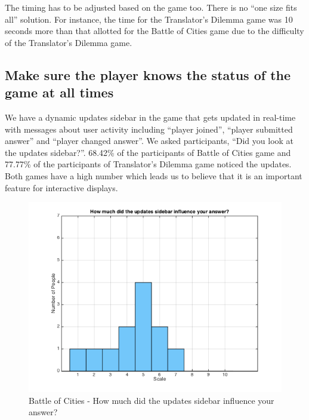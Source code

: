 \documentclass{sig-alternate}
\begin{document}
The timing has to be adjusted based on the game too. There is no ``one size fits all'' solution. For instance, the time for the Translator's Dilemma game was 10 seconds more than that allotted for the Battle of Cities game due to the difficulty of the Translator's Dilemma game.

\subsection{Make sure the player knows the status of the game at all times}
We have a dynamic updates sidebar in the game that gets updated in real-time with messages about user activity including ``player joined'', ``player submitted answer'' and ``player changed answer''. We asked participants, ``Did you look at the updates sidebar?''. 68.42\% of the participants of Battle of Cities game and 77.77\% of the participants of Translator's Dilemma game noticed the updates. Both games have a high number which leads us to believe that it is an important feature for interactive displays.

\begin{figure}
	\includegraphics[width=\linewidth]{p_influence.png}
	\caption{Battle of Cities - How much did the updates sidebar influence your answer?}
	\label{fig:p_influence}
\end{figure}
\end{document}

